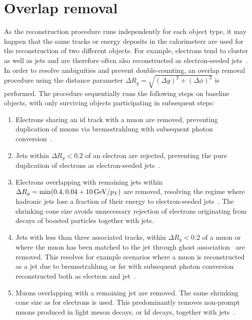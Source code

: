 \section{Overlap removal}\label{sec:overlap_removal}

As the reconstruction procedure runs independently for each object type, it may happen that the same tracks or energy deposits in the calorimeters are used for the reconstruction of two different objects. For example, electrons tend to cluster as well as jets and are therefore often also reconstructed as electron-seeded jets~\cite{overlapremoval:1700874}. In order to resolve ambiguities and prevent double-counting, an overlap removal procedure using the distance parameter $\Delta R_y = \sqrt{(\Delta y)^2+(\Delta \phi)^2}$ is performed. The procedure sequentially runs the following steps on baseline objects, with only surviving objects participating in subsequent steps:
\begin{enumerate}
	\item Electrons sharing an \gls{id} track with a muon are removed, preventing duplication of muons via bremsstrahlung with subsequent photon conversion~\cite{overlapremoval:1700874}.
	\item Jets within $\Delta R_y < 0.2$ of an electron are rejected, preventing the pure duplication of electrons as electron-seeded jets~\cite{overlapremoval:1700874}.
	\item Electrons overlapping with remaining jets within $\Delta R_y = \min (0.4, 0.04+\SI{10}{\GeV}/\pt)$ are removed, resolving the regime where hadronic jets lose a fraction of their energy to electron-seeded jets~\cite{overlapremoval:1700874}. The shrinking cone size avoids unnecessary rejection of electrons originating from decays of boosted particles together with jets.
	\item Jets with less than three associated tracks, within $\Delta R_y < 0.2$ of a muon or where the muon has been matched to the jet through ghost association~\cite{ghostassociation:2008gn} are removed. This resolves for example scenarios where a muon is reconstructed as a jet due to bremsstrahlung or \gls{fsr} with subsequent photon conversion reconstructed both as electron and jet~\cite{overlapremoval:1700874}.
	\item Muons overlapping with a remaining jet are removed. The same shrinking cone size as for electrons is used. This predominantly removes non-prompt muons produced in light meson decays, or \gls{hf} decays, together with jets~\cite{overlapremoval:1700874}. 
\end{enumerate} 


